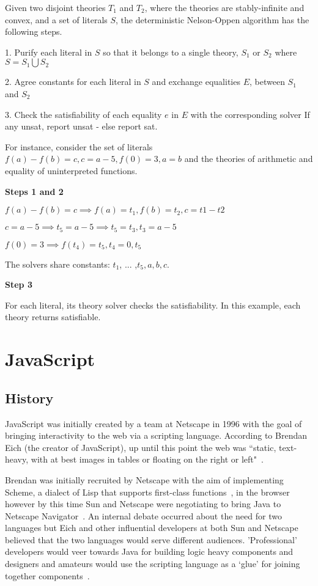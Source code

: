 \documentclass[]{final_report}
\begin{document}
Given two disjoint theories $T_1$ and $T_2$, where the theories are stably-infinite and convex, and a set of literals $S$, the deterministic Nelson-Oppen algorithm has the following steps.

1. Purify each literal in $S$ so that it belongs to a single theory, $S_1$ or $S_2$ where $S = S_1 \bigcup S_2$

2. Agree constants for each literal in $S$ and exchange equalities $E$, between $S_1$ and $S_2$

3. Check the satisfiability of each equality $e$ in $E$ with the corresponding solver If any unsat, report unsat - else report sat.

For instance, consider the set of literals $f(a) - f(b) = c, c = a -5, f(0) = 3, a = b$ and the theories of arithmetic and equality of uninterpreted functions.

\textbf{Steps 1 and 2}

$f(a) - f(b) = c \implies f(a) = t_1, f(b) = t_2, c = t1 - t2$

$c = a - 5 \implies t_5 = a - 5 \implies t_5 = t_3, t_3 = a- 5$

$f(0) =3 \implies f(t_4) = t_5, t_4 = 0, t_5$

The solvers share constants: $t_1$, ... ,$t_5, a, b, c$.

\textbf{Step 3}

For each literal, its theory solver checks the satisfiability. In this example, each theory returns satisfiable.

\chapter{JavaScript}

\section{History}

JavaScript was initially created by a team at Netscape in 1996 with the goal of bringing interactivity to the web via a scripting language. According to Brendan Eich (the creator of JavaScript), up until this point the web was ``static, text-heavy, with at best images in tables or floating on the right or left"~\cite{AZProgrammingLanguages}. 

Brendan was initially recruited by Netscape with the aim of implementing Scheme, a dialect of Lisp that supports first-class functions~\cite{dybvig1996scheme}, in the browser however by this time Sun and Netscape were negotiating to bring Java to Netscape Navigator~\cite{popularityofjavascript}. An internal debate occurred about the need for two languages but Eich and other influential developers at both Sun and Netscape believed that the two languages would serve different audiences. 'Professional' developers would veer towards Java for building logic heavy components and designers and amateurs would use the scripting language as a `glue' for joining together components~\cite{AZProgrammingLanguages}.
\end{document}
